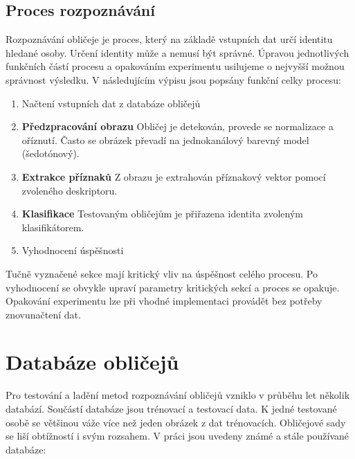 \documentclass[czech,BP]{thesiskiv}
\begin{document}
\subsection{Proces rozpoznávání}
Rozpoznávání obličeje je proces, který na základě vstupních dat určí identitu hledané osoby. Určení identity může a nemusí být správné. Úpravou jednotlivých funkčních částí procesu a opakováním experimentu usilujeme o nejvyšší možnou správnost výsledku. V následujícím výpisu jsou popsány funkční celky procesu:
 
\begin{enumerate}
\item Načtení vstupních dat z databáze obličejů
\item \textbf{Předzpracování obrazu} Obličej je detekován, provede se normalizace a oříznutí. Často se obrázek převadí na jednokanálový barevný model (šedotónový).
\item \textbf{Extrakce příznaků} Z obrazu je extrahován příznakový vektor pomocí zvoleného deskriptoru.
\item \textbf{Klasifikace} Testovaným obličejům je přiřazena identita zvoleným klasifikátorem.
\item Vyhodnocení úspěšnosti
\end{enumerate}

Tučně vyznačené sekce mají kritický vliv na úspěšnost celého procesu. Po vyhodnocení se obvykle upraví parametry kritických sekcí a proces se opakuje. Opakování experimentu lze při vhodné implementaci provádět bez potřeby znovunačtení dat. 

\section{Databáze obličejů}
Pro testování a ladění metod rozpoznávání obličejů vzniklo v průběhu let několik databází. Součástí databáze jsou trénovací a testovací data. K jedné testované osobě se většinou váže více než jeden obrázek z dat trénovacích. Obličejové sady se liší obtížností i svým rozsahem. V práci \citet{LencUfi2015} jsou uvedeny známé a stále používané databáze:
\end{document}
